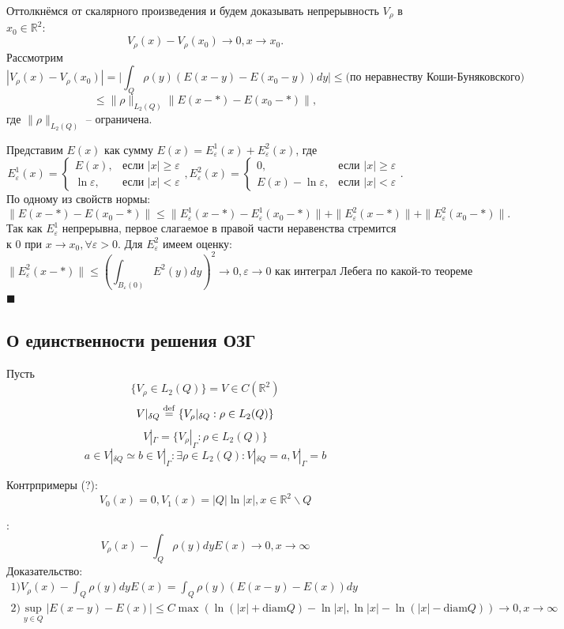 \documentclass[a4paper, 12pt]{article}
\newcommand{\R}[1]{\mathbb{R}^#1}
\newenvironment{Proof} %
{\par\noindent{\bf Доказательство.}} %
{\hfill$\scriptstyle\blacksquare$} %
\begin{document}
\begin{Proof}
  Оттолкнёмся от скалярного произведения и будем доказывать непрерывность $V_{\rho}$ в $x_0 \in \R{2}$:
$$V_{\rho}(x)-V_{\rho}(x_0) \rightarrow 0, x \rightarrow x_0.$$
Рассмотрим 
$$|V_{\rho}(x)-V_{\rho}(x_0)|=\biggl|\int_Q \rho(y) \left(E(x-y)-E(x_0-y) \right)dy\biggl| \leq \text{(по неравнеству Коши-Буняковского)}$$
$$\leq \| \rho\|_{L_2(Q)}\|E(x-*)-E(x_0-*)\|,$$
где $\| \rho\|_{L_2(Q)}$ -- ограничена. 

Представим $E(x)$ как сумму $E(x)= E^1_{\varepsilon} (x)+{E}^2_{\varepsilon}(x)$, где
\[
E^1_{\varepsilon}(x) =
\begin{cases}
E(x), & \text{если $|x|\geq \varepsilon$} \\
\ln \varepsilon, & \text{если $|x|<\varepsilon$}
\end{cases},
E^2_{\varepsilon}(x) =
\begin{cases}
0, & \text{если $|x|\geq \varepsilon$} \\
E(x)-\ln \varepsilon, & \text{если $|x|<\varepsilon$}
\end{cases}.
\]
По одному из свойств нормы:
$$\|E(x-*)-E(x_0-*)\| \leq \|E^1_{\varepsilon}(x-*)-E^1_{\varepsilon}(x_0-*)\|+\|E^2_{\varepsilon}(x-*)\|+\|E^2_{\varepsilon}(x_0-*)\|.$$
Так как $E^1_{\varepsilon}$ непрерывна, первое слагаемое в правой части неравенства стремится к 0 при $x \rightarrow x_0, \forall \varepsilon >0$.
Для $E^2_{\varepsilon}$ имеем оценку:
$$\| E^2_{\varepsilon}(x-*)\| \leq \left(\int_{B_{\varepsilon}(0)}E^2(y) dy \right)^2 \rightarrow 0, \varepsilon \rightarrow 0 \text{ как интеграл Лебега по какой-то теореме}$$
\end{Proof}

\subsection{О единственности решения ОЗГ}
Пусть
$$\{V_{\rho} \in L_2(Q)\}=V \in C(\R{2})$$
\def\MYdef{\mathrel{\stackrel{\rm def}=}}
$$V|_{\delta Q}\MYdef \{V_{\rho}|_{\delta Q}: \rho \in L_2(Q)\}$$
$$V|_{\Gamma}= \{V_{\rho}|_{\Gamma}: \rho \in L_2(Q)\}$$
$$a \in V|_{\delta Q} \simeq b \in V|_{\Gamma}: \exists \rho \in L_2(Q):V|_{\delta Q}=a,V|_{\Gamma}=b$$

Контрпримеры (?):
$$V_0(x)=0, V_1 (x) = |Q|\ln|x|, x \in \R{2} \backslash Q$$

{}:
$$V_{\rho}(x)-\int_Q \rho(y) dy E(x) \rightarrow 0, x \rightarrow \infty$$
Доказательство:
\begin{multline}
    1)V_{\rho}(x)-\int_Q \rho(y) dy E(x)=\int_Q \rho(y) (E(x-y)-E(x))dy\\
    2) \sup_{y \in Q}|E(x-y)-E(x)| \leq C \max (\ln(|x|+\text{diam} Q)-\ln|x|,\ln|x|-\ln(|x|-\text{diam} Q)) \rightarrow 0, x \rightarrow \infty
\end{multline}
\end{document}
